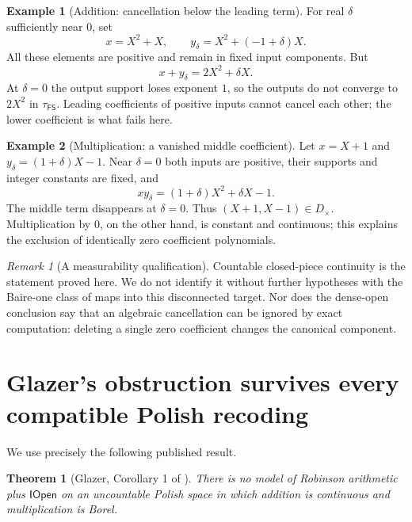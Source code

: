 \documentclass[11pt]{article}
\numberwithin{equation}{section}
\newtheorem{theorem}{Theorem}[section]
\theoremstyle{definition}
\newtheorem{example}[example]{Example}
\theoremstyle{remark}
\newtheorem{remark}[remark]{Remark}
\newcommand{\IOpen}{\mathsf{IOpen}}
\newcommand{\FS}{\mathsf{FS}}
\begin{document}
\begin{example}[Addition: cancellation below the leading term]
For real $\delta$ sufficiently near $0$, set
\[
 x=X^2+X,\qquad y_\delta=X^2+(-1+\delta)X.
\]
All these elements are positive and remain in fixed input components. But
\[
 x+y_\delta=2X^2+\delta X.
\]
At $\delta=0$ the output support loses exponent $1$, so the outputs do not
converge to $2X^2$ in $\tau_{\FS}$. Leading coefficients of positive inputs
cannot cancel each other; the lower coefficient is what fails here.
\end{example}

\begin{example}[Multiplication: a vanished middle coefficient]
Let $x=X+1$ and $y_\delta=(1+\delta)X-1$. Near $\delta=0$ both inputs are
positive, their supports and integer constants are fixed, and
\[
 xy_\delta=(1+\delta)X^2+\delta X-1.
\]
The middle term disappears at $\delta=0$. Thus $(X+1,X-1)\in D_\times$.
Multiplication by $0$, on the other hand, is constant and continuous; this
explains the exclusion of identically zero coefficient polynomials.
\end{example}

\begin{remark}[A measurability qualification]
Countable closed-piece continuity is the statement proved here. We do not
identify it without further hypotheses with the Baire-one class of maps into
this disconnected target. Nor does the dense-open conclusion say that an
algebraic cancellation can be ignored by exact computation: deleting a single
zero coefficient changes the canonical component.
\end{remark}

\section{Glazer's obstruction survives every compatible Polish recoding}
\label{pma:bor:sec:glazer}

We use precisely the following published result.
\begin{theorem}[Glazer, Corollary 1 of \cite{Glazer}]
\label{pma:bor:thm:Glazerinput}
There is no model of Robinson arithmetic plus $\IOpen$ on an uncountable
Polish space in which addition is continuous and multiplication is Borel.
\end{theorem}
\end{document}
